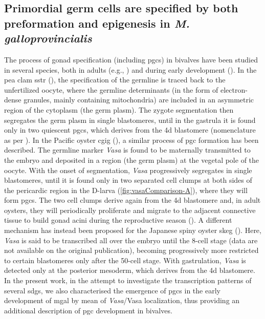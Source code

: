 \subsection{Primordial germ cells are specified by both preformation and epigenesis in \textit{M. galloprovincialis}}\label{chapter:insitu-discussionVasa}
The process of gonad specification (including \glspl{pgc}) in bivalves have been studied in several species, both in adults (e.g., ) and during early development (). In the pea clam \gls{sstr} (), the specification of the germline is traced back to the unfertilized oocyte, where the germline determinants (in the form of electron-dense granules, mainly containing mitochondria) are included in an asymmetric region of the cytoplasm (the germ plasm). The zygote segmentation then segregates the germ plasm in single blastomeres, until in the gastrula it is found only in two quiescent \glspl{pgc}, which derives from the 4d blastomere (nomenclature as per ). In the Pacific oyster \gls{cgig} (), a similar process of \gls{pgc} formation has been described. The germline marker \textit{Vasa} is found to be maternally transmitted to the embryo and deposited in a region (the germ plasm) at the vegetal pole of the oocyte. With the onset of segmentation, \textit{Vasa} progressively segregates in single blastomeres, until it is found only in two separated cell clumps at both sides of the pericardic region in the D-larva (\cref{fig:vasaComparison-A}), where they will form \glspl{pgc}. The two cell clumps derive again from the 4d blastomere and, in adult oysters, they will periodically proliferate and migrate to the adjacent connective tissue to build gonad acini during the reproductive season (). A different mechanism has instead been proposed for the Japanese spiny oyster \gls{skeg} (). Here, \textit{Vasa} is said to be transcribed all over the embryo until the 8-cell stage (data are not available on the original publication), becoming progressively more restricted to certain blastomeres only after the 50-cell stage. With gastrulation, \textit{Vasa} is detected only at the posterior mesoderm, which derives from the 4d blastomere. In the present work, in the attempt to investigate the transcription patterns of several \glspl{sdg}, we also characterised the emergence of \glspl{pgc} in the early development of \gls{mgal} by mean of \textit{Vasa}/Vasa localization, thus providing an additional description of \gls{pgc} development in bivalves.

